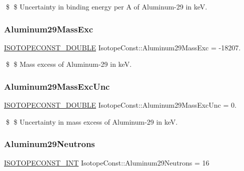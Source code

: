 \$ \$ Uncertainty in binding energy per A of Aluminum-\/29 in keV. \mbox{\label{group___isotope_const-_aluminum-_al29_ga2e7f23ef273027c53f21b03f2eb80d8a}} 
\subsubsection{\texorpdfstring{Aluminum29\+Mass\+Exc}{Aluminum29MassExc}}
{\footnotesize\ttfamily \mbox{\hyperlink{group___isotope_const-_macros_ga8f45a7272ce02c0b4c65c44636ed719a}{I\+S\+O\+T\+O\+P\+E\+C\+O\+N\+S\+T\+\_\+\+D\+O\+U\+B\+LE}} Isotope\+Const\+::\+Aluminum29\+Mass\+Exc = -\/18207.}

\$ \$ Mass excess of Aluminum-\/29 in keV. \mbox{\label{group___isotope_const-_aluminum-_al29_ga49e8abc59c546c7c5f490e2a32287b4f}} 
\subsubsection{\texorpdfstring{Aluminum29\+Mass\+Exc\+Unc}{Aluminum29MassExcUnc}}
{\footnotesize\ttfamily \mbox{\hyperlink{group___isotope_const-_macros_ga8f45a7272ce02c0b4c65c44636ed719a}{I\+S\+O\+T\+O\+P\+E\+C\+O\+N\+S\+T\+\_\+\+D\+O\+U\+B\+LE}} Isotope\+Const\+::\+Aluminum29\+Mass\+Exc\+Unc = 0.}

\$ \$ Uncertainty in mass excess of Aluminum-\/29 in keV. \mbox{\label{group___isotope_const-_aluminum-_al29_gad2d415468da118cb12320d56ad92c444}} 
\subsubsection{\texorpdfstring{Aluminum29\+Neutrons}{Aluminum29Neutrons}}
{\footnotesize\ttfamily \mbox{\hyperlink{group___isotope_const-_macros_ga5f18360b3e99483a35c32d789e62621c}{I\+S\+O\+T\+O\+P\+E\+C\+O\+N\+S\+T\+\_\+\+I\+NT}} Isotope\+Const\+::\+Aluminum29\+Neutrons = 16}

